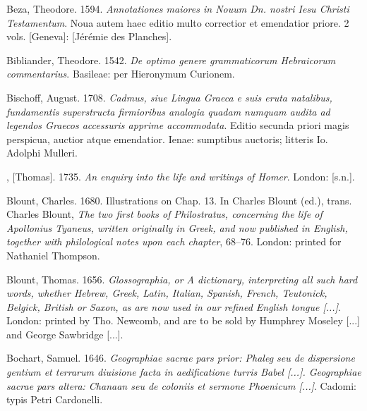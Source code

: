 \begin{styleStandard}
Beza, Theodore. 1594. \textit{Annotationes maiores in Nouum Dn. nostri Iesu Christi Testamentum}. Noua autem haec editio multo correctior et emendatior priore. 2 vols. [Geneva]: [Jérémie des Planches].
\end{styleStandard}

\begin{styleStandard}
Bibliander, Theodore. 1542. \textit{De optimo genere grammaticorum Hebraicorum commentarius}. Basileae: per Hieronymum Curionem.
\end{styleStandard}

\begin{styleStandard}
Bischoff, August. 1708. \textit{Cadmus, siue Lingua Graeca e suis eruta natalibus, fundamentis superstructa firmioribus analogia quadam numquam audita ad legendos Graecos accessuris apprime accommodata}. Editio secunda priori magis perspicua, auctior atque emendatior. Ienae: sumptibus auctoris; litteris Io. Adolphi Mulleri.
\end{styleStandard}

\begin{styleStandard}
[Blackwell], [Thomas]. 1735. \textit{An enquiry into the life and writings of Homer}. London: [s.n.].
\end{styleStandard}

\begin{styleStandard}
Blount, Charles. 1680. Illustrations on Chap. 13. In Charles Blount (ed.), trans. Charles Blount, \textit{The two first books of Philostratus, concerning the life of Apollonius Tyaneus, written originally in Greek, and now published in English, together with philological notes upon each chapter}, 68–76. London: printed for Nathaniel Thompson.
\end{styleStandard}

\begin{styleStandard}
Blount, Thomas. 1656. \textit{Glossographia, or A dictionary, interpreting all such hard words, whether Hebrew, Greek, Latin, Italian, Spanish, French, Teutonick, Belgick, British or Saxon, as are now used in our refined English tongue [...]}. London: printed by Tho. Newcomb, and are to be sold by Humphrey Moseley [...] and George Sawbridge [...].
\end{styleStandard}

\begin{styleStandard}
Bochart, Samuel. 1646. \textit{Geographiae sacrae pars prior: Phaleg seu de dispersione gentium et terrarum diuisione facta in aedificatione turris Babel [...]. Geographiae sacrae pars altera: Chanaan seu de coloniis et sermone Phoenicum [...]}. Cadomi: typis Petri Cardonelli.
\end{styleStandard}

